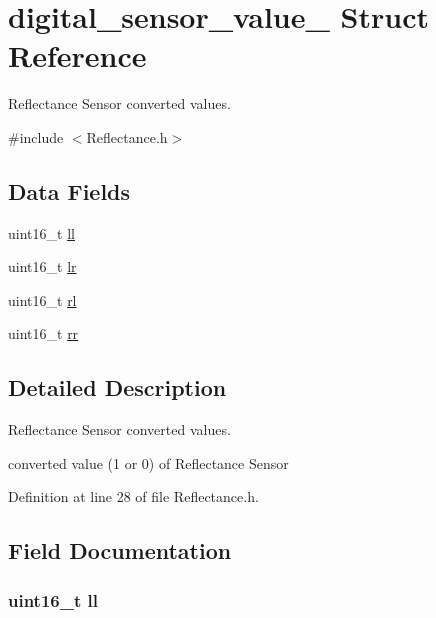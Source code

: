 \hypertarget{structdigital__sensor__value__}{}\section{digital\+\_\+sensor\+\_\+value\+\_\+ Struct Reference}
\label{structdigital__sensor__value__}


Reflectance Sensor converted values.  




{\ttfamily \#include $<$Reflectance.\+h$>$}

\subsection*{Data Fields}
\begin{DoxyCompactItemize}
\item 
uint16\+\_\+t \hyperlink{structdigital__sensor__value___ae59d16ddcc59d6f6633ff99307ff7190}{ll}
\item 
uint16\+\_\+t \hyperlink{structdigital__sensor__value___af650f74b54fbe6d55c96161d2a7098ea}{lr}
\item 
uint16\+\_\+t \hyperlink{structdigital__sensor__value___a55f8b53aee5b41e8af88a816fab2b70b}{rl}
\item 
uint16\+\_\+t \hyperlink{structdigital__sensor__value___a6988d1a89f109b3f8d0e06547a5362f6}{rr}
\end{DoxyCompactItemize}


\subsection{Detailed Description}
Reflectance Sensor converted values. 

converted value (1 or 0) of Reflectance Sensor 

Definition at line 28 of file Reflectance.\+h.



\subsection{Field Documentation}
\subsubsection[{\texorpdfstring{ll}{ll}}]{\setlength{\rightskip}{0pt plus 5cm}uint16\+\_\+t ll}\hypertarget{structdigital__sensor__value___ae59d16ddcc59d6f6633ff99307ff7190}{}\label{structdigital__sensor__value___ae59d16ddcc59d6f6633ff99307ff7190}


